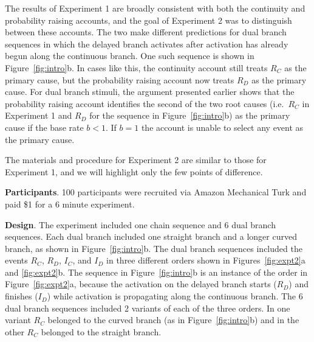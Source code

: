 \documentclass[10pt,letterpaper]{article}
\newcommand{\ev}[2]{$#1_#2$}
\begin{document}
The results of Experiment 1 are broadly consistent with both the continuity and probability raising accounts, and the goal of Experiment 2 was to distinguish between these accounts. The two make different predictions for dual branch sequences in which the delayed branch activates after activation has already begun along the continuous branch. One such sequence is shown in Figure~\ref{fig:intro}b. 
In cases like this, the continuity account still treats \ev{R}{C} as the primary cause, but the probability raising account now treats \ev{R}{D} as the primary cause. For dual branch stimuli, the argument presented earlier shows that the probability raising account identifies the second of the two root causes (i.e.\ \ev{R}{C} in Experiment 1 and \ev{R}{D} for the sequence in Figure~\ref{fig:intro}b) as the primary cause if the base rate $b < 1$.  If $b=1$ the account is unable to select any event as the primary cause.

The materials and procedure for Experiment 2 are similar to those for Experiment 1, and we will highlight only the few points of difference.  

\textbf{Participants}. 100 participants were recruited via Amazon Mechanical Turk and paid \$1 for a 6 minute experiment. 


\textbf{Design}. 
The experiment included one chain sequence and 6 dual branch sequences. Each dual branch included one straight branch and a longer curved branch, as shown in Figure~\ref{fig:intro}b. The dual branch sequences included the events \ev{R}{C}, \ev{R}{D}, \ev{I}{C}, and \ev{I}{D} in three different orders shown in Figures~\ref{fig:expt2}a and \ref{fig:expt2}b. The sequence in Figure~\ref{fig:intro}b is an instance of the order in Figure~\ref{fig:expt2}a, because the activation on the delayed branch starts (\ev{R}{D}) and finishes (\ev{I}{D}) while activation is propagating along the continuous branch. The 6 dual branch sequences included 2 variants of each of the three orders. In one variant \ev{R}{C} belonged to the curved branch (as in Figure~\ref{fig:intro}b) and in the other \ev{R}{C} belonged to the straight branch. 
\end{document}

